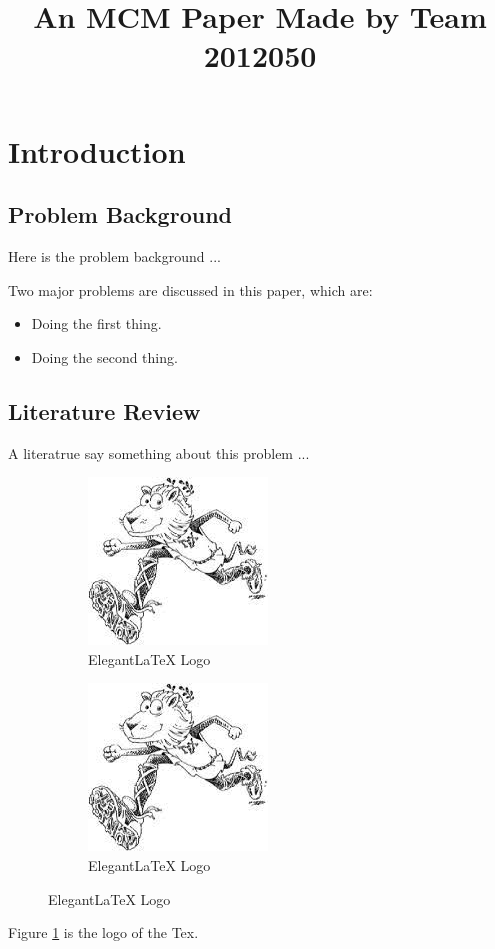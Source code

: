 \documentclass[12pt]{article}
\title{An MCM Paper Made by Team 2012050}  %
\begin{document}

\section{Introduction}
\subsection{Problem Background}
Here is the problem background\cite{Song2010Determining} ...

Two major problems are discussed in this paper, which are:
\begin{itemize}
    \item Doing the first thing.
    \item Doing the second thing.
\end{itemize}

\subsection{Literature Review}
A literatrue say something about this problem ...

\begin{figure}[h]
	\begin{subfigure}[b]{.5\textwidth}
		\centering
		\includegraphics{logo.png}
			\caption{ElegantLaTeX Logo}
	\end{subfigure}
	\begin{subfigure}[b]{.5\textwidth}
	\centering
	\includegraphics{logo.png}
		\caption{ElegantLaTeX Logo}
	\end{subfigure}	
	\caption{ElegantLaTeX Logo}
	\label{fig:logo}
\end{figure}
Figure \ref{fig:logo} is the logo of the Tex. 
\end{document}
